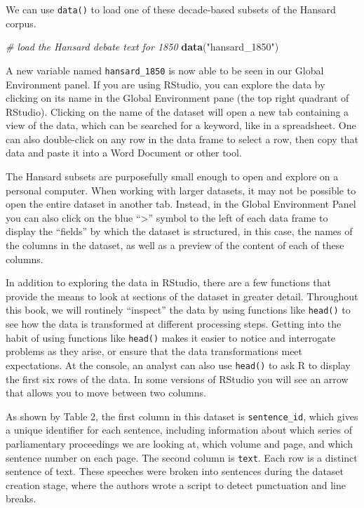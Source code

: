 \documentclass[
]{article}
\newenvironment{Shaded}{\begin{snugshade}}{\end{snugshade}}
\newcommand{\CommentTok}[1]{\textcolor[rgb]{0.56,0.35,0.01}{\textit{#1}}}
\newcommand{\FunctionTok}[1]{\textcolor[rgb]{0.13,0.29,0.53}{\textbf{#1}}}
\newcommand{\NormalTok}[1]{#1}
\newcommand{\StringTok}[1]{\textcolor[rgb]{0.31,0.60,0.02}{#1}}
\begin{document}
We can use \texttt{data()} to load one of these decade-based subsets of
the Hansard corpus.

\begin{Shaded}
\begin{Highlighting}[]
\CommentTok{\# load the Hansard debate text for 1850}
\FunctionTok{data}\NormalTok{(}\StringTok{"hansard\_1850"}\NormalTok{)}
\end{Highlighting}
\end{Shaded}

A new variable named \texttt{hansard\_1850} is now able to be seen in
our Global Environment panel. If you are using RStudio, you can explore
the data by clicking on its name in the Global Environment pane (the top
right quadrant of RStudio). Clicking on the name of the dataset will
open a new tab containing a view of the data, which can be searched for
a keyword, like in a spreadsheet. One can also double-click on any row
in the data frame to select a row, then copy that data and paste it into
a Word Document or other tool.

The Hansard subsets are purposefully small enough to open and explore on
a personal computer. When working with larger datasets, it may not be
possible to open the entire dataset in another tab. Instead, in the
Global Environment Panel you can also click on the blue
``\textgreater{}'' symbol to the left of each data frame to display the
``fields'' by which the dataset is structured, in this case, the names
of the columns in the dataset, as well as a preview of the content of
each of these columns.

In addition to exploring the data in RStudio, there are a few functions
that provide the means to look at sections of the dataset in greater
detail. Throughout this book, we will routinely ``inspect'' the data by
using functions like \texttt{head()} to see how the data is transformed
at different processing steps. Getting into the habit of using functions
like \texttt{head()} makes it easier to notice and interrogate problems
as they arise, or ensure that the data transformations meet
expectations. At the console, an analyst can also use \texttt{head()} to
ask R to display the first six rows of the data. In some versions of
RStudio you will see an arrow that allows you to move between two
columns.

As shown by Table 2, the first column in this dataset is
\texttt{sentence\_id}, which gives a unique identifier for each
sentence, including information about which series of parliamentary
proceedings we are looking at, which volume and page, and which sentence
number on each page. The second column is \texttt{text}. Each row is a
distinct sentence of text. These speeches were broken into sentences
during the dataset creation stage, where the authors wrote a script to
detect punctuation and line breaks.
\end{document}
